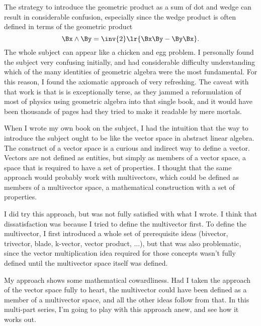The strategy to introduce the geometric product as a sum of dot and wedge can result in considerable confusion, especially since the wedge product is often defined in terms of the geometric product
\begin{equation}\label{eqn:inthepipe:40}
\Bx \wedge \By =
\inv{2} \lr{
\Bx \By - \By \Bx
}.
\end{equation}
The whole subject can appear like a chicken and egg problem.
I personally found the subject very confusing initially, and had considerable difficulty understanding which of the many identities of geometric algebra were the most fundamental.
For this reason, I found the axiomatic approach of \citep{doran2003gap} very refreshing.
The caveat with that work is that is is exceptionally terse, as they jammed a reformulation of most of physics using geometric algebra into that single book, and it would have been thousands of pages had they tried to make it readable by mere mortals.

When I wrote my own book on the subject, I had the intuition that the way to introduce the subject ought to be like the vector space in abstract linear algebra.
The construct of a vector space is a curious and indirect way to define a vector.
Vectors are not defined as entities, but simply as members of a vector space, a space that is required to have a set of properties.
I thought that the same approach would probably work with multivectors, which could be defined as members of a multivector space, a mathematical construction with a set of properties.

I did try this approach, but was not fully satisfied with what I wrote.
I think that dissatisfaction was because I tried to define the multivector first.
To define the multivector, I first introduced a whole set of
prerequisite ideas (bivector, trivector, blade, k-vector, vector product, ...), but that was also problematic, since the vector multiplication idea required for those concepts wasn't fully defined until the multivector space itself was defined.

My approach shows some mathematical cowardliness.
Had I taken the approach of the vector space fully to heart, the multivector could have been defined as a member of a multivector space, and all the other ideas follow from that.
In this multi-part series, I'm going to play with this approach anew, and see how it works out.
